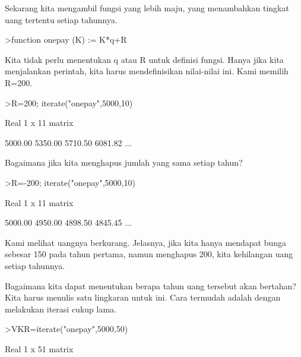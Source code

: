 \begin{eulernotebook}
\begin{eulercomment}
\begin{eulercomment}
\begin{eulercomment}
Sekarang kita mengambil fungsi yang lebih maju, yang menambahkan
tingkat uang tertentu setiap tahunnya.
\end{eulercomment}
\begin{eulerprompt}
>function onepay (K) := K*q+R
\end{eulerprompt}
\begin{eulercomment}
Kita tidak perlu menentukan q atau R untuk definisi fungsi. Hanya jika
kita menjalankan perintah, kita harus mendefinisikan nilai-nilai ini.
Kami memilih R=200.
\end{eulercomment}
\begin{eulerprompt}
>R=200; iterate("onepay",5000,10)
\end{eulerprompt}
\begin{euleroutput}
  Real 1 x 11 matrix
  
      5000.00     5350.00     5710.50     6081.82     ...
\end{euleroutput}
\begin{eulercomment}
Bagaimana jika kita menghapus jumlah yang sama setiap tahun?
\end{eulercomment}
\begin{eulerprompt}
>R=-200; iterate("onepay",5000,10)
\end{eulerprompt}
\begin{euleroutput}
  Real 1 x 11 matrix
  
      5000.00     4950.00     4898.50     4845.45     ...
\end{euleroutput}
\begin{eulercomment}
Kami melihat uangnya berkurang. Jelasnya, jika kita hanya mendapat
bunga sebesar 150 pada tahun pertama, namun menghapus 200, kita
kehilangan uang setiap tahunnya.

Bagaimana kita dapat menentukan berapa tahun uang tersebut akan
bertahan? Kita harus menulis satu lingkaran untuk ini. Cara termudah
adalah dengan melakukan iterasi cukup lama.
\end{eulercomment}
\begin{eulerprompt}
>VKR=iterate("onepay",5000,50)
\end{eulerprompt}
\begin{euleroutput}
  Real 1 x 51 matrix
  

\end{euleroutput}
\end{eulercomment}
\end{eulercomment}
\end{eulernotebook}
